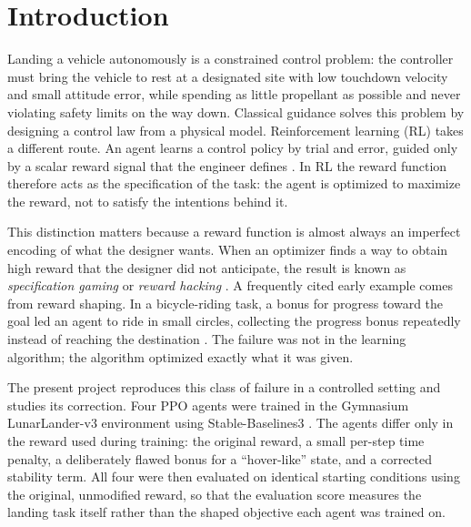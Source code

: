 \documentclass[11pt,a4paper]{article}
\begin{document}
\section{Introduction}\label{sec:intro}

Landing a vehicle autonomously is a constrained control problem: the controller must bring the vehicle to rest at a designated site with low touchdown velocity and small attitude error, while spending as little propellant as possible and never violating safety limits on the way down. Classical guidance solves this problem by designing a control law from a physical model. Reinforcement learning (RL) takes a different route. An agent learns a control policy by trial and error, guided only by a scalar reward signal that the engineer defines \cite{sutton2018}. In RL the reward function therefore acts as the specification of the task: the agent is optimized to maximize the reward, not to satisfy the intentions behind it.

This distinction matters because a reward function is almost always an imperfect encoding of what the designer wants. When an optimizer finds a way to obtain high reward that the designer did not anticipate, the result is known as \emph{specification gaming} \cite{krakovna2020} or \emph{reward hacking} \cite{amodei2016,skalse2022}. A frequently cited early example comes from reward shaping. In a bicycle-riding task, a bonus for progress toward the goal led an agent to ride in small circles, collecting the progress bonus repeatedly instead of reaching the destination \cite{randlov1998,ng1999}. The failure was not in the learning algorithm; the algorithm optimized exactly what it was given.

The present project reproduces this class of failure in a controlled setting and studies its correction. Four PPO agents \cite{schulman2017} were trained in the Gymnasium LunarLander-v3 environment \cite{towers2025,gymLunar} using Stable-Baselines3 \cite{raffin2021}. The agents differ only in the reward used during training: the original reward, a small per-step time penalty, a deliberately flawed bonus for a ``hover-like'' state, and a corrected stability term. All four were then evaluated on identical starting conditions using the original, unmodified reward, so that the evaluation score measures the landing task itself rather than the shaped objective each agent was trained on.
\end{document}
